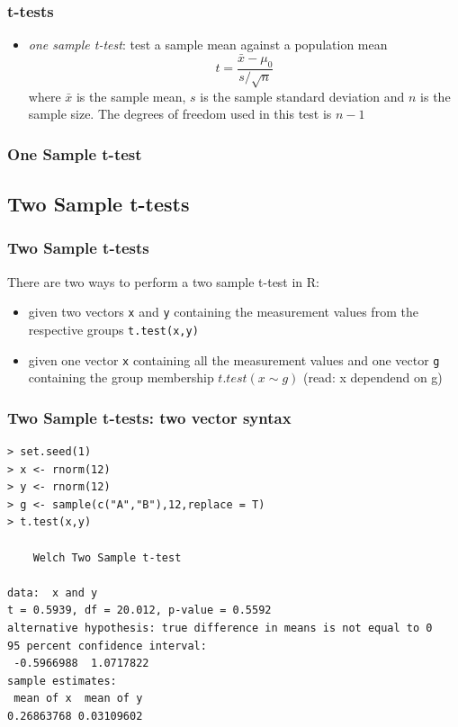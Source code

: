 \documentclass[xcolor={table}]{beamer}
\begin{document}

\begin{frame}[fragile]\frametitle{t-tests}
\begin{itemize}
\item \emph{one sample t-test}: test a sample mean against a population mean
$$ t = \frac{\bar{x}-\mu_0}{s/\sqrt{n}}$$ where $\bar{x}$ is the sample mean, $s$ is the sample standard deviation and $n$ is the sample size. The degrees of freedom used in this test is $n-1$
\end{itemize}
\end{frame}

\begin{frame}[fragile]\frametitle{One Sample t-test}
\end{frame}


\subsection{Two Sample t-tests}


\begin{frame}[fragile]\frametitle{Two Sample t-tests}
There are two ways to perform a two sample t-test in R:
\begin{itemize}
\item given two vectors \texttt{x} and \texttt{y} containing the measurement values from the respective groups \texttt{t.test(x,y)}
\item given one vector \texttt{x} containing all the measurement values and one vector \texttt{g} containing the group membership $t.test(x \sim g)$ (read: x dependend on g)
\end{itemize}
\end{frame}

\begin{frame}[fragile]\frametitle{Two Sample t-tests: two vector syntax}\footnotesize
\begin{verbatim}
> set.seed(1)
> x <- rnorm(12)
> y <- rnorm(12)
> g <- sample(c("A","B"),12,replace = T)
> t.test(x,y)

	Welch Two Sample t-test

data:  x and y
t = 0.5939, df = 20.012, p-value = 0.5592
alternative hypothesis: true difference in means is not equal to 0
95 percent confidence interval:
 -0.5966988  1.0717822
sample estimates:
 mean of x  mean of y 
0.26863768 0.03109602   
\end{verbatim}
\end{frame}
\end{document}
